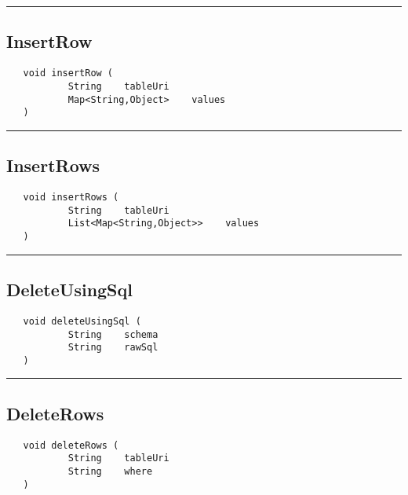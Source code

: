 \rule{15cm}{2pt}
\subsection{InsertRow}
\label{Api:InsertRow}
\begin{verbatim}
   void insertRow (
           String    tableUri
           Map<String,Object>    values
   )
\end{verbatim}



\rule{15cm}{2pt}
\subsection{InsertRows}
\label{Api:InsertRows}
\begin{verbatim}
   void insertRows (
           String    tableUri
           List<Map<String,Object>>    values
   )
\end{verbatim}



\rule{15cm}{2pt}
\subsection{DeleteUsingSql}
\label{Api:DeleteUsingSql}
\begin{verbatim}
   void deleteUsingSql (
           String    schema
           String    rawSql
   )
\end{verbatim}



\rule{15cm}{2pt}
\subsection{DeleteRows}
\label{Api:DeleteRows}
\begin{verbatim}
   void deleteRows (
           String    tableUri
           String    where
   )
\end{verbatim}



